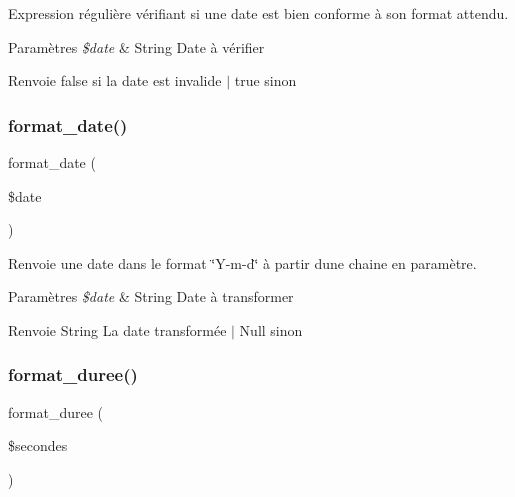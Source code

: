 Expression régulière vérifiant si une date est bien conforme à son format attendu. 


\begin{DoxyParams}{Paramètres}
{\em \$date} & String Date à vérifier \\
\hline
\end{DoxyParams}
\begin{DoxyReturn}{Renvoie}
false si la date est invalide $\vert$ true sinon 
\end{DoxyReturn}
\mbox{\label{variables_8php_aac671b7526e88db82a81d2dbc528aff7}} 
\subsubsection{\texorpdfstring{format\+\_\+date()}{format\_date()}}
{\footnotesize\ttfamily format\+\_\+date (\begin{DoxyParamCaption}\item[{}]{\$date }\end{DoxyParamCaption})}



Renvoie une date dans le format \char`\"{}\+Y-\/m-\/d\char`\"{} à partir d\textquotesingle{}une chaine en paramètre. 


\begin{DoxyParams}{Paramètres}
{\em \$date} & String Date à transformer \\
\hline
\end{DoxyParams}
\begin{DoxyReturn}{Renvoie}
String La date transformée $\vert$ Null sinon 
\end{DoxyReturn}
\mbox{\label{variables_8php_a3ef8ef70095240ef2a669927187e8816}} 
\subsubsection{\texorpdfstring{format\+\_\+duree()}{format\_duree()}}
{\footnotesize\ttfamily format\+\_\+duree (\begin{DoxyParamCaption}\item[{}]{\$secondes }\end{DoxyParamCaption})}



